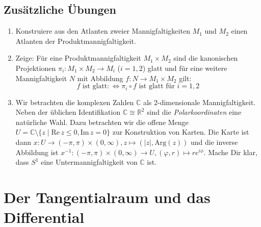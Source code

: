 \documentclass[a4paper]{scrartcl}
\newcommand{\R}{\mathbb{R}}
\begin{document}
	\subsection{Zusätzliche Übungen}
	\begin{enumerate}
		\item Konstruiere aus den Atlanten zweier Mannigfaltigkeiten $M_1$ und $M_2$ einen Atlanten der Produktmannigfaltigkeit.
		\item Zeige: Für eine Produktmannigfaltigkeit $M_1\times M_2$ sind die kanonischen Projektionen $\pi_i\colon M_1\times M_2\rightarrow M_i$ ($i=1,2$) glatt und für eine weitere Mannigfaltigkeit $N$ mit Abbildung $f\colon N\rightarrow M_1\times M_2$ gilt:
		\begin{equation}
		\text{$f$ ist glatt} \colon\Leftrightarrow \pi_i\circ f \text{ ist glatt für } i=1,2
		\end{equation}
		\item Wir betrachten die komplexen Zahlen $\mathbb{C}$ als $2$-dimensionale Mannigfaltigkeit. Neben der üblichen Identifikation $\mathbb{C}\cong\R^2$ sind die \emph{Polarkoordinaten} eine natürliche Wahl. Dazu betrachten wir die offene Menge $U = \mathbb{C}\setminus\{z\mid \mathrm{Re}\,z\leq 0, \mathrm{Im}\,z=0\}$ zur Konstruktion von Karten.  Die Karte ist dann $x\colon U\rightarrow (-\pi,\pi)\times (0,\infty), z\mapsto (\lvert z\rvert, \mathrm{Arg}(z))$ und die inverse Abbildung ist $x^{-1}\colon (-\pi,\pi)\times (0,\infty)\rightarrow U, (\varphi,r)\mapsto re^{i\phi}$. Mache Dir klar, dass $S^1$ eine Untermannigfaltigkeit von $\mathbb{C}$ ist.
	\end{enumerate}

	\section{Der Tangentialraum und das Differential}
\end{document}

